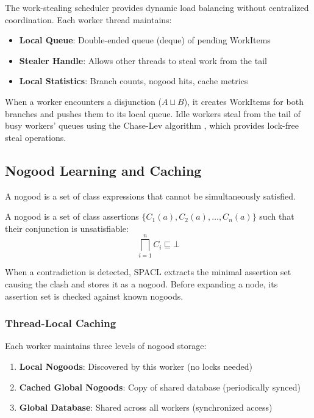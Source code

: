 \documentclass[preprint,12pt]{elsarticle}
\begin{document}
The work-stealing scheduler provides dynamic load balancing without centralized coordination. Each worker thread maintains:

\begin{itemize}
    \item \textbf{Local Queue}: Double-ended queue (deque) of pending WorkItems
    \item \textbf{Stealer Handle}: Allows other threads to steal work from the tail
    \item \textbf{Local Statistics}: Branch counts, nogood hits, cache metrics
\end{itemize}

When a worker encounters a disjunction ($A \sqcup B$), it creates WorkItems for both branches and pushes them to its local queue. Idle workers steal from the tail of busy workers' queues using the Chase-Lev algorithm \cite{workstealing}, which provides lock-free steal operations.

\subsection{Nogood Learning and Caching}
\label{sec:nogood}

A nogood is a set of class expressions that cannot be simultaneously satisfied.

\begin{definition}[Nogood]
\label{def:nogood}
A nogood is a set of class assertions $\{C_1(a), C_2(a), \ldots, C_n(a)\}$ such that their conjunction is unsatisfiable:
\begin{equation}
\bigsqcap_{i=1}^{n} C_i \sqsubseteq \bot
\end{equation}
\end{definition}

When a contradiction is detected, SPACL extracts the minimal assertion set causing the clash and stores it as a nogood. Before expanding a node, its assertion set is checked against known nogoods.

\subsubsection{Thread-Local Caching}
\label{sec:cache}

Each worker maintains three levels of nogood storage:

\begin{enumerate}
    \item \textbf{Local Nogoods}: Discovered by this worker (no locks needed)
    \item \textbf{Cached Global Nogoods}: Copy of shared database (periodically synced)
    \item \textbf{Global Database}: Shared across all workers (synchronized access)
\end{enumerate}
\end{document}

